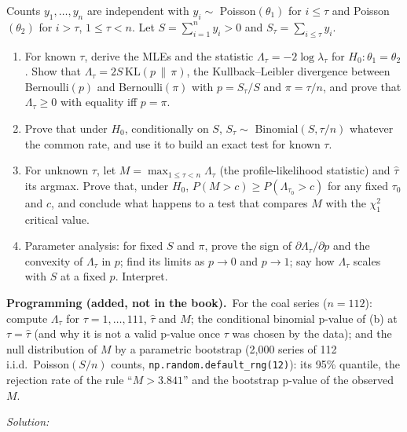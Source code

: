 \documentclass[11pt,a4paper]{article}
\newif\ifsolucoes
\newcommand{\espacoresol}{4.5cm}   %
\numberwithin{equation}{questao}   %
\newcommand{\programacao}{\par\smallskip\noindent\textbf{Programming (added, not in the book).}~}
\newcommand{\resolespaco}{\ifsolucoes\else\par\textit{Solution:}\vspace{\espacoresol}\par\fi}
\newcommand{\1}{\mathbf{1}}
\begin{document}
Counts $y_1,\dots,y_n$ are independent with $y_i\sim$ Poisson$(\theta_1)$ for $i\le\tau$ and
Poisson$(\theta_2)$ for $i>\tau$, $1\le\tau<n$. Let $S=\sum_{i=1}^ny_i>0$ and $S_\tau=\sum_{i\le\tau}y_i$.
\begin{enumerate}[label=\textbf{(\alph*)},leftmargin=2.4em]
\item For known $\tau$, derive the MLEs and the statistic $\Lambda_\tau=-2\log\lambda_\tau$ for
$H_0:\theta_1=\theta_2$. Show that $\Lambda_\tau=2S\,\mathrm{KL}(p\,\|\,\pi)$, the Kullback--Leibler
divergence between Bernoulli$(p)$ and Bernoulli$(\pi)$ with $p=S_\tau/S$ and $\pi=\tau/n$, and
prove that $\Lambda_\tau\ge0$ with equality iff $p=\pi$.
\item Prove that under $H_0$, conditionally on $S$, $S_\tau\sim$ Binomial$(S,\tau/n)$ whatever the
common rate, and use it to build an exact test for known $\tau$.
\item For unknown $\tau$, let $M=\max_{1\le\tau<n}\Lambda_\tau$ (the profile-likelihood statistic) and
$\hat\tau$ its argmax. Prove that, under $H_0$, $P(M>c)\ge P(\Lambda_{\tau_0}>c)$ for any fixed
$\tau_0$ and $c$, and conclude what happens to a test that compares $M$ with the $\chi^2_1$ critical
value.
\item Parameter analysis: for fixed $S$ and $\pi$, prove the sign of $\partial\Lambda_\tau/\partial p$
and the convexity of $\Lambda_\tau$ in $p$; find its limits as $p\to0$ and $p\to1$; say how
$\Lambda_\tau$ scales with $S$ at a fixed $p$. Interpret.
\end{enumerate}
\programacao For the coal series ($n=112$): compute $\Lambda_\tau$ for $\tau=1,\dots,111$, $\hat\tau$
and $M$; the conditional binomial p-value of (b) at $\tau=\hat\tau$ (and why it is not a valid
p-value once $\tau$ was chosen by the data); and the null distribution of $M$ by a parametric
bootstrap (2{,}000 series of 112 i.i.d.\ Poisson$(S/n)$ counts, \texttt{np.random.default\_rng(12)}):
its 95\% quantile, the rejection rate of the rule ``$M>3.841$'' and the bootstrap p-value of the
observed $M$.
\resolespaco
\end{document}
